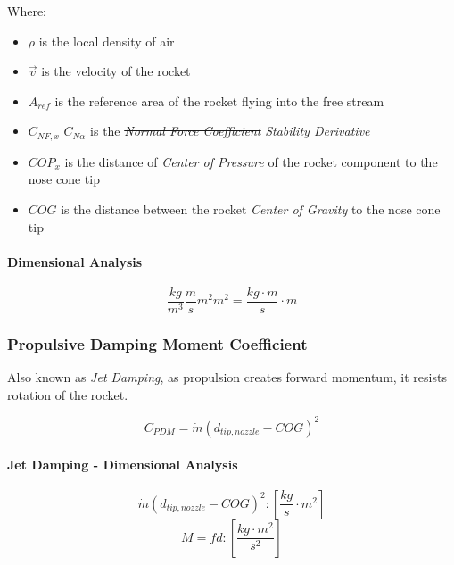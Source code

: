\documentclass[]{book}
\providecommand{\tightlist}{%
  \setlength{\itemsep}{0pt}\setlength{\parskip}{0pt}}
\let\oldparagraph\paragraph
\renewcommand{\paragraph}[1]{\oldparagraph{#1}\mbox{}}
\begin{document}
Where:

\begin{itemize}
\tightlist
\item
  \(\rho\) is the local density of air
\item
  \(\vec{v}\) is the velocity of the rocket
\item
  \(A_{ref}\) is the reference area of the rocket flying into the free
  stream
\item
  \sout{\(C_{NF,x}\)} \(C_{N \alpha}\) is the \sout{\emph{Normal Force
  Coefficient}} \emph{Stability Derivative}
\item
  \(COP_{x}\) is the distance of \emph{Center of Pressure} of the rocket
  component to the nose cone tip
\item
  \(COG\) is the distance between the rocket \emph{Center of Gravity} to
  the nose cone tip
\end{itemize}

\paragraph{Dimensional Analysis}\label{dimensional-analysis-1}

\begin{equation}
\label{eq_c2a_dim_anal}
\dfrac{kg}{m^3} \dfrac{m}{s} m^2 m^2 = \dfrac{kg \cdot m }{s} \cdot m 
\end{equation}

\subsubsection{Propulsive Damping Moment
Coefficient}\label{propulsive-damping-moment-coefficient}

Also known as \emph{Jet Damping}, as propulsion creates forward
momentum, it resists rotation of the rocket.

\begin{equation}
\label{eq_coef_moment_damping_jet}
C_{PDM} = \dot{m} \left( d_{tip,nozzle} - COG \right) ^2
\end{equation}

\paragraph{Jet Damping - Dimensional
Analysis}\label{jet-damping---dimensional-analysis}

\[
\dot{m} \left( d_{tip,nozzle} - COG \right) ^2 :
\left[ \dfrac{kg}{s} \cdot m^2 \right]
\] \[
M = fd : 
\left[ \dfrac{kg \cdot m^2}{s^2} \right]
\]
\end{document}
